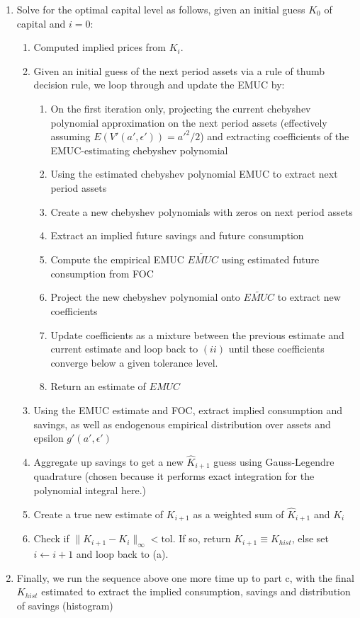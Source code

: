 \documentclass[11pt]{article}
\begin{document}
\begin{enumerate}
	\item Solve for the optimal capital level as follows, given an initial guess $K_0$ of capital and $i=0$:
	\begin{enumerate}
	\item Computed implied prices from $K_i$.
	\item Given an initial guess of the next period assets via a rule of thumb decision rule, we loop through and update the EMUC by:
	\begin{enumerate}
	\item On the first iteration only, projecting the current chebyshev polynomial approximation on the next period assets (effectively assuming $E(V'(a',\epsilon'))={a'}^2/2$) and extracting coefficients of  the EMUC-estimating chebyshev polynomial
	\item Using the estimated chebyshev polynomial EMUC to extract next period assets
	\item   Create a new  chebyshev polynomials with zeros on next period assets
	\item Extract an implied future savings and future consumption
	\item  Compute the empirical EMUC $\widetilde{EMUC}$ using estimated future consumption from FOC
	\item  Project the new chebyshev polynomial onto $\widetilde{EMUC}$ to extract new coefficients
	\item  Update coefficients as a mixture between the previous estimate and current estimate and loop back to $(ii)$ until these coefficients converge below a given tolerance level.	
	\item Return an estimate of $EMUC$
	\end{enumerate}
	\item Using the EMUC estimate and FOC, extract implied consumption and savings, as well as endogenous empirical distribution over assets and epsilon $g'(a',\epsilon')$
	\item Aggregate up savings to get a new $\hat{K}_{i+1}$ guess using Gauss-Legendre quadrature (chosen because it performs exact integration for the polynomial integral here.)
	\item Create a true new estimate of $K_{i+1}$ as a weighted sum of $\hat{K}_{i+1}$ and $K_{i}$ 
	\item Check  if $\lVert{K_{i+1} - K_{i}}\rVert_{\infty}<\text{tol} $. If so, return $K_{i+1}\equiv K_{hist}$, else set $i \leftarrow i+1$ and loop back to (a).
	\end{enumerate}
	\item Finally, we run the sequence above one more time up to part c, with the final $K_{hist}$ estimated to extract the implied consumption, savings and distribution of savings (histogram)
\end{enumerate}
\end{document}
